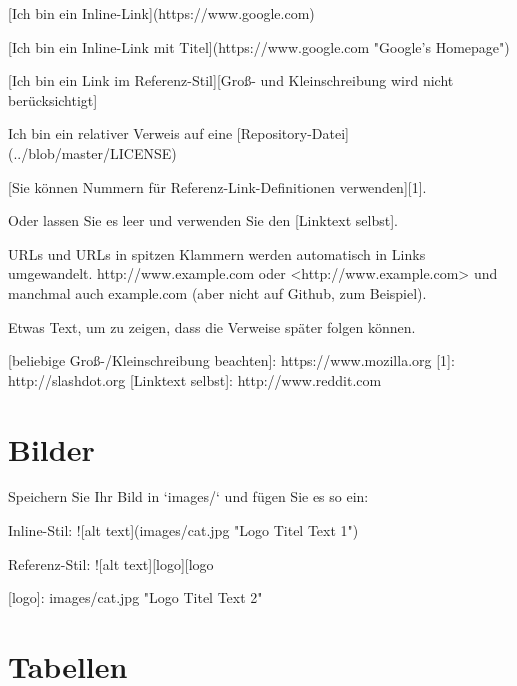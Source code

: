 \documentclass[12pt,de-CH,twoside,openright]{report}
\newenvironment{Shaded}{\begin{snugshade}}{\end{snugshade}}
\newcommand{\AlertTok}[1]{\textcolor[rgb]{0.94,0.16,0.16}{#1}}
\newcommand{\BaseNTok}[1]{\textcolor[rgb]{0.00,0.00,0.81}{#1}}
\newcommand{\NormalTok}[1]{#1}
\newcommand{\OtherTok}[1]{\textcolor[rgb]{0.56,0.35,0.01}{#1}}
\begin{document}
\begin{Shaded}
\begin{Highlighting}[]
\OtherTok{[Ich bin ein Inline-Link](https://www.google.com)}

\OtherTok{[Ich bin ein Inline-Link mit Titel](https://www.google.com "Google's Homepage")}

\OtherTok{[Ich bin ein Link im Referenz-Stil][Groß- und Kleinschreibung wird nicht berücksichtigt]}

\NormalTok{Ich bin ein relativer Verweis auf eine }\OtherTok{[Repository-Datei](../blob/master/LICENSE)}

\OtherTok{[Sie können Nummern für Referenz-Link-Definitionen verwenden][1]}\NormalTok{.}

\NormalTok{Oder lassen Sie es leer und verwenden Sie den [Linktext selbst].}

\NormalTok{URLs und URLs in spitzen Klammern werden automatisch in Links umgewandelt.}
\NormalTok{http://www.example.com oder }\OtherTok{<http://www.example.com>}\NormalTok{ und manchmal auch}
\NormalTok{example.com (aber nicht auf Github, zum Beispiel).}

\NormalTok{Etwas Text, um zu zeigen, dass die Verweise später folgen können.}

\OtherTok{[beliebige Groß-/Kleinschreibung beachten]: https://www.mozilla.org}
\OtherTok{[1]: http://slashdot.org}
\OtherTok{[Linktext selbst]: http://www.reddit.com}
\end{Highlighting}
\end{Shaded}

\hypertarget{bilder}{%
\section{Bilder}\label{bilder}}

\begin{Shaded}
\begin{Highlighting}[]
\NormalTok{Speichern Sie Ihr Bild in }\BaseNTok{`images/`}\NormalTok{ und fügen Sie es so ein:}

\NormalTok{Inline-Stil:}
\AlertTok{![alt text](images/cat.jpg "Logo Titel Text 1")}

\NormalTok{Referenz-Stil:}
\AlertTok{![alt text][logo]}\NormalTok{[logo}

\OtherTok{[logo]: images/cat.jpg "Logo Titel Text 2"}
\end{Highlighting}
\end{Shaded}

\hypertarget{tabellen}{%
\section{Tabellen}\label{tabellen}}
\end{document}
